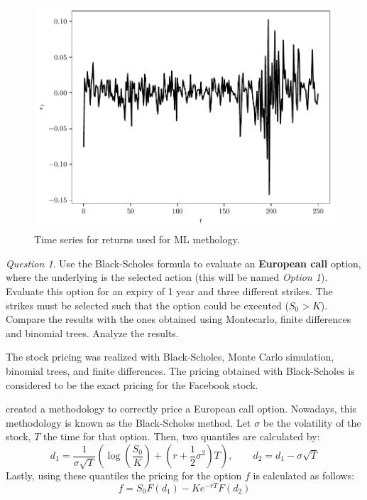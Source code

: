 \documentclass[11pt]{article}
\theoremstyle{definition}
\theoremstyle{remark}
\theoremstyle{remark}
\newtheorem{question}{Question}
\newcommand{\expp}[1]{e^{#1}}
\begin{document}
\begin{figure}[ht]
  \centering
  \includegraphics[scale=.5]{../plts/returns_js}
  \caption{Time series for returns used for ML methology.}
  \label{fig:rtjs}
\end{figure}
\begin{question}
  Use the Black-Scholes formula to evaluate an \textbf{European call} option,
  where the underlying is the selected action (this will be named \textit{Option
    1}). Evaluate this option for an expiry of 1 year and three different
  strikes. The strikes must be selected such that the option could be executed
  ($S_0>K$). Compare the results with the ones obtained using Montecarlo, finite
  differences and binomial trees. Analyze the results.
\end{question}

The stock pricing was realized with Black-Scholes, Monte Carlo simulation,
binomial trees, and finite differences. The pricing obtained with Black-Scholes
is considered to be the exact pricing for the Facebook stock.

\textcite{black1973} created a methodology to correctly price a European call
option. Nowadays, this methodology is known as the Black-Scholes method. Let
$\sigma$ be the volatility of the stock, $T$ the time for that option. Then, two
quantiles are calculated by:
\begin{equation*}
  d_{1} = \frac{1}{\sigma \sqrt{T}} \left(\log\left(\frac{S_{0}}{K}\right)
    + \left(r + \frac{1}{2}\sigma^{2}\right) T\right), \qquad d_{2} = d_{1} - \sigma \sqrt{T}
\end{equation*}
Lastly, using these quantiles the pricing for the option $f$ is calculated as follows:
\begin{equation*}
  f = S_{0} F(d_{1}) - K \expp{-rT} F(d_{2})
\end{equation*}
\end{document}

